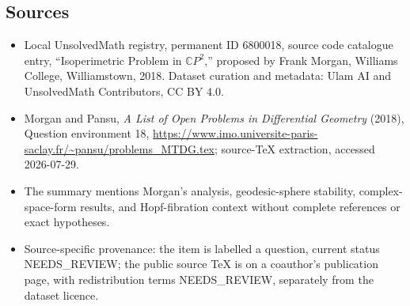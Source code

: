 \documentclass[11pt]{article}
\newcommand{\C}{\mathbb{C}}
\begin{document}
\subsection{Sources}
\begin{itemize}
\item Local UnsolvedMath registry, permanent ID 6800018, source code catalogue entry, ``Isoperimetric Problem in $\C P^2$,'' proposed by Frank Morgan, Williams College, Williamstown, 2018. Dataset curation and metadata: Ulam AI and UnsolvedMath Contributors, CC BY 4.0.
\item Morgan and Pansu, \emph{A List of Open Problems in Differential Geometry} (2018), Question environment 18, \url{https://www.imo.universite-paris-saclay.fr/~pansu/problems_MTDG.tex}; source-TeX extraction, accessed 2026-07-29.
\item The summary mentions Morgan's analysis, geodesic-sphere stability, complex-space-form results, and Hopf-fibration context without complete references or exact hypotheses.
\item Source-specific provenance: the item is labelled a question, current status NEEDS\_REVIEW; the public source TeX is on a coauthor's publication page, with redistribution terms NEEDS\_REVIEW, separately from the dataset licence.
\end{itemize}
\end{document}
